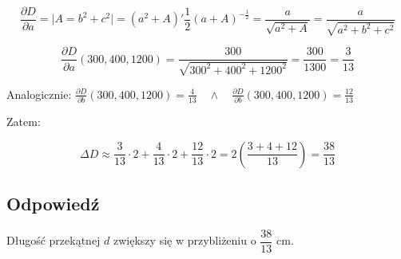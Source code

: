 \documentclass{article}
\newcommand{\partderiv}[2]{\frac{\partial #1}{\partial #2}}
\DeclareMathOperator{\?}{?}
\begin{document}
\begin{equation*}
   \partderiv{D}{a} = \Big| A = b^2 + c^2 \Big| = (a^2 + A)'\frac{1}{2}(a+A)^{-\frac{1}{2}}
   = \frac{a}{\sqrt{a^2 + A}} = \frac{a}{\sqrt{a^2 + b^2 + c^2}}
\end{equation*}

\begin{equation*}
   \partderiv{D}{a}(300,400,1200) = \frac{300}{\sqrt{300^2 + 400^2 + 1200^2}} = \frac{300}{1300} = \frac{3}{13}
\end{equation*}

\vspace{1em}
Analogicznie: \quad $\displaystyle
\partderiv{D}{b}(300,400,1200) = \frac{4}{13}
\quad\land\quad
\partderiv{D}{b}(300,400,1200) = \frac{12}{13}$

\vspace{1em}
Zatem:

\begin{equation*}
   \Delta{D} \approx \frac{3}{13} \cdot 2 + \frac{4}{13} \cdot 2 + \frac{12}{13} \cdot 2
   = 2\left(\frac{3+4+12}{13}\right) = \frac{38}{13}
\end{equation*}

\subsection*{Odpowiedź}

Długość przekątnej $d$ zwiększy się w przybliżeniu o $\dfrac{38}{13}$ cm.
\end{document}
